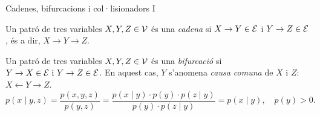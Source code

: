 \documentclass{bestbeamer}
\begin{document}
\begin{frame}{Cadenes, bifurcacions i col·lisionadors I}
\begin{definition}\label{def:chain}
Un patró de tres variables $X,Y,Z\in\mathcal{V}$ és una \emph{cadena} si $X\to Y\in \mathcal{E}$ i $Y\to Z\in \mathcal{E}$, és a dir, $X \to Y \to Z$. 
\end{definition}
\begin{definition}\label{def:fork}
Un patró de tres variables $X,Y,Z\in\mathcal{V}$ és una \emph{bifurcació} si $Y \to X \in \mathcal{E}\text{ i } Y \to Z \in \mathcal{E}$. En aquest cas, $Y$ s'anomena \emph{causa comuna} de $X$ i $Z$: $X \leftarrow Y \to Z$.
\begin{equation*}
p(x\mid y,z)=\frac{p(x,y,z)}{p(y,z)}=\frac{p(x\mid y)\cdot p(y)\cdot p(z\mid y)}{p(y)\cdot p(z\mid y)}=p(x\mid y), \quad p(y)>0.
\end{equation*}
\end{definition}
\end{frame}
\end{document}
